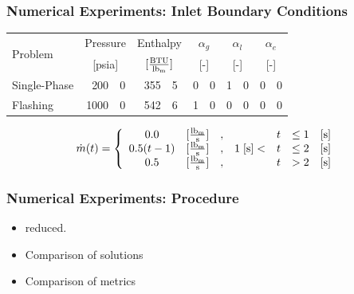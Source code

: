 \documentclass[compress,xcolor=table]{beamer}
\begin{document}
\begin{frame}
\frametitle{Numerical Experiments: Inlet Boundary Conditions}

\begin{table}[ht]
\centering
\begin{tabular}{@{}lr@{.}lr@{.}lr@{.}lr@{.}lr@{.}l@{}} \toprule
\multirow{2}{*}{Problem} & \multicolumn{2}{c}{Pressure} & \multicolumn{2}{c}{Enthalpy}             & \multicolumn{2}{c}{$\alpha_g$} & \multicolumn{2}{c}{$\alpha_l$} & \multicolumn{2}{c}{$\alpha_e$} \\ 
                         & \multicolumn{2}{c}{[psia]} & \multicolumn{2}{c}{$[\frac{\text{BTU}}{\lbm{}}]$} & \multicolumn{2}{c}{[-]}      & \multicolumn{2}{c}{[-]}      & \multicolumn{2}{c}{[-]}      \\ \midrule
Single-Phase             &  200&0                       &  355&5                                   & 0&0                            & 1&0                            & 0&0 \\
Flashing                 & 1000&0                       &  542&6                                   & 1&0                            & 0&0                            & 0&0 \\ \bottomrule  
\end{tabular}
\label{tab:bc_fe}
\end{table}

\begin{equation*}
\label{eqn:bc_time_func_single}
\dot{m}(t) = \left\{
\begin{array}{cclrcll}
 0.0           & [\frac{ \lbm{} }{\text{s}}] & , &                & t & \leq 1 & [\text{s}] \\
 0.5 ( t - 1)  & [\frac{ \lbm{} }{\text{s}}] & , & 1\; [\text{s}] < & t & \leq 2 & [\text{s}] \\
 0.5           & [\frac{ \lbm{} }{\text{s}}] & , &                & t & > 2    & [\text{s}]
\end{array}\right.
\end{equation*}

\end{frame}
\begin{frame}
\frametitle{Numerical Experiments: Procedure}

\begin{itemize}
\item{\dtmax{} reduced.}
\item{Comparison of solutions}
\item{Comparison of metrics}
\end{itemize}

\end{frame}
\end{document}
